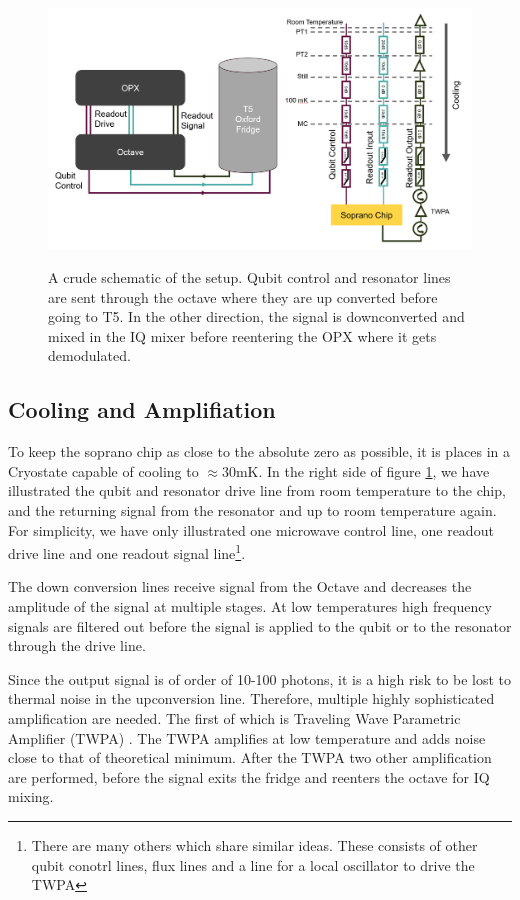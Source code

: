 \begin{figure}[t]
    \caption{A crude schematic of the setup. Qubit control and resonator lines are sent through the octave where they are up converted before going to T5. In the other direction, the signal is downconverted and mixed in the IQ mixer before reentering the OPX where it gets demodulated.}
    \includegraphics[]{Figs/hardware/fridge_and_control.png}
    \label{fig:Fridge_control_hardware_setup}
\end{figure}


\subsection{Cooling and Amplifiation}
To keep the soprano chip as close to the absolute zero as possible, it is places in a Cryostate capable of cooling to $\approx 30 \text{mK}$. In the right side of  figure \ref{fig:Fridge_control_hardware_setup}, we have illustrated the qubit and resonator drive line from room temperature to the chip, and the returning signal from the resonator and up to room temperature again. For simplicity, we have only illustrated one microwave control line, one readout drive line and one readout signal line\footnote{There are many others which share similar ideas. These consists of other qubit conotrl lines, flux lines and a line for a local oscillator to drive the TWPA}.

The down conversion lines receive signal from the Octave and decreases the amplitude of the signal at multiple stages. At low temperatures high frequency signals are filtered out before the signal is applied to the qubit or to the resonator through the drive line.

Since the output signal is of order of 10-100 photons, it is a high risk to be lost to thermal noise in the upconversion line. Therefore, multiple highly sophisticated amplification are needed. The first of which is Traveling Wave Parametric Amplifier (TWPA) \cite{macklin_nearquantum-limited_2015}. The TWPA amplifies at low temperature and adds noise close to that of theoretical minimum. After the TWPA two other amplification are performed, before the signal exits the fridge and reenters the octave for IQ mixing. 


